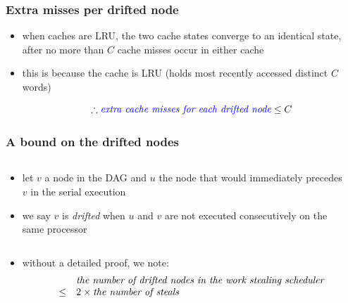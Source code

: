\documentclass[12pt,dvipdfmx]{beamer}
\newcommand{\ao}[1]{{\color{blue}#1}}
\begin{document}
\begin{frame}
\frametitle{Extra misses per drifted node}
\begin{itemize}
\item when caches are LRU, the two cache states
  converge to an identical state, after no more
  than $C$ cache misses occur in either cache

\begin{center}
\def\svgwidth{0.7\textwidth}
{\scriptsize}
\end{center}

\item this is because the cache is LRU (holds
  most recently accessed distinct $C$ words)

\[ 
\therefore \mbox{\ao{\em extra cache misses for each drifted node}} \leq C 
\]
\end{itemize}
\end{frame}

\begin{frame}
\frametitle{A bound on the drifted nodes}

\begin{columns}
\begin{column}{0.55\textwidth}
\begin{itemize}
\item let $v$ a node in the DAG and $u$ the node
  that would immediately precedes $v$ in the
  serial execution

\item we say $v$ is \ao{\em drifted} when $u$ and
  $v$ are not executed consecutively on the same
  processor
\end{itemize}
\end{column}

\begin{column}{0.45\textwidth}
\begin{center}
\def\svgwidth{0.9\textwidth}
{\scriptsize}
\end{center}
\end{column}
\end{columns}

\begin{itemize}
\item without a detailed proof, we note:
\[
  \begin{array}{ll}
& \mbox{\em the number of drifted nodes in the work stealing scheduler} \\
\leq & 2 \times \mbox{\em the number of steals} 
  \end{array}
\]
\end{itemize}
\end{frame}
\end{document}
